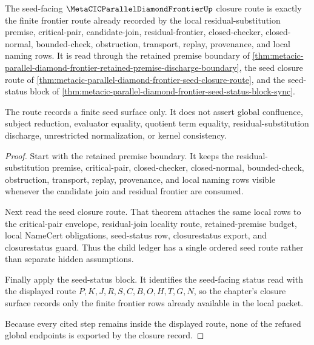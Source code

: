 \begin{theorem}
\label{thm:metacic-parallel-diamond-frontier-closure-route}
The seed-facing $\MetaCICParallelDiamondFrontierUp$ closure route is exactly the finite frontier route already recorded by the local residual-substitution premise, critical-pair, candidate-join, residual-frontier, closed-checker, closed-normal, bounded-check, obstruction, transport, replay, provenance, and local naming rows. It is read through the retained premise boundary of \autoref{thm:metacic-parallel-diamond-frontier-retained-premise-discharge-boundary}, the seed closure route of \autoref{thm:metacic-parallel-diamond-frontier-seed-closure-route}, and the seed-status block of \autoref{thm:metacic-parallel-diamond-frontier-seed-status-block-sync}.

The route records a finite seed surface only. It does not assert global confluence, subject reduction, evaluator equality, quotient term equality, residual-substitution discharge, unrestricted normalization, or kernel consistency.
\end{theorem}
\begin{proof}
Start with the retained premise boundary. It keeps the residual-substitution premise, critical-pair, closed-checker, closed-normal, bounded-check, obstruction, transport, replay, provenance, and local naming rows visible whenever the candidate join and residual frontier are consumed.

Next read the seed closure route. That theorem attaches the same local rows to the critical-pair envelope, residual-join locality route, retained-premise budget, local NameCert obligations, seed-status row, closurestatus export, and closurestatus guard. Thus the child ledger has a single ordered seed route rather than separate hidden assumptions.

Finally apply the seed-status block. It identifies the seed-facing status read with the displayed route $P,K,J,R,S,C,B,O,H,T,G,N$, so the chapter's closure surface records only the finite frontier rows already available in the local packet.

Because every cited step remains inside the displayed route, none of the refused global endpoints is exported by the closure record.
\end{proof}
